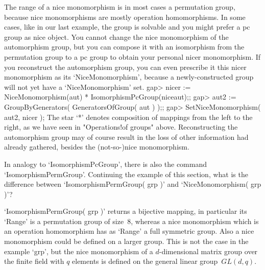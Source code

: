 The range  of a nice  monomorphism is in most  cases a permutation group,
because nice  monomorphisms are  mostly operation homomorphisms.  In some
cases, like  in our  last example,  the group is   solvable and you might
prefer a pc group as nice object. You cannot change the nice monomorphism
of the automorphism  group, but  you  can compose it  with an isomorphism
from the permutation  group to a pc  group to obtain your personal  nicer
monomorphism. If you  reconstruct the automorphism   group, you can  even
prescribe it this nicer monomorphism as its `NiceMonomorphism', because a
newly-constructed group will not yet have a `NiceMonomorphism' set.
\beginexample
    gap> nicer := NiceMonomorphism(aut) * IsomorphismPcGroup(niceaut);;
    gap> aut2 := GroupByGenerators( GeneratorsOfGroup( aut ) );;
    gap> SetNiceMonomorphism( aut2, nicer );
\endexample
The star `*' denotes composition of mappings  from the left to the right,
as we  have  seen in  "Operations!of  groups" above.   Reconstructing the
automorphism group may of course result in the  loss of other information
{\GAP} had already gathered, besides the (not-so-)nice monomorphism.

\exercise In  analogy to `IsomorphismPcGroup', there  is also the command
`IsomorphismPermGroup'. Continuing  the example of  this section, what is
the    difference   between      `IsomorphismPermGroup(   grp  )'     and
`NiceMonomorphism( grp )'?

\answer `IsomorphismPermGroup( grp  )'  returns a bijective   mapping, in
particular its  `Range' is a permutation  group of size~8, whereas a nice
monomorphism  which  is an operation homomorphism   has as `Range' a full
symmetric group. Also a  nice monomorphism could  be defined on a  larger
group. This is   not   the case in   the   example `grp', but   the  nice
monomorphism of a $d$-dimensional matrix group over the finite field with
$q$ elements is defined on the general linear group~$GL(d,q)$.

